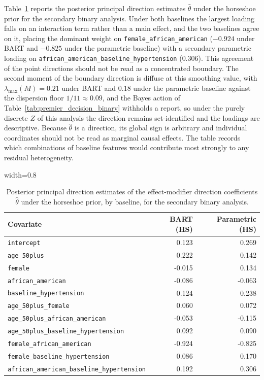 \documentclass[11pt]{article}
\theoremstyle{definition}
\theoremstyle{plain}
\begin{document}
Table~\ref{tab:theta_hat_hs_methods} reports the posterior principal direction estimates $\hat{\theta}$ under the horseshoe prior for the secondary binary analysis. Under both baselines the largest loading falls on an interaction term rather than a main effect, and the two baselines agree on it, placing the dominant weight on \texttt{female\_african\_american} ($-0.924$ under BART and $-0.825$ under the parametric baseline) with a secondary parametric loading on \texttt{african\_american\_baseline\_hypertension} ($0.306$). This agreement of the point directions should not be read as a concentrated boundary. The second moment of the boundary direction is diffuse at this smoothing value, with $\lambda_{\max}(M)=0.21$ under BART and $0.18$ under the parametric baseline against the dispersion floor $1/11\approx0.09$, and the Bayes action of Table~\ref{tab:premier_decision_binary} withholds a report, so under the purely discrete $Z$ of this analysis the direction remains set-identified and the loadings are descriptive. Because $\hat{\theta}$ is a direction, its global sign is arbitrary and individual coordinates should not be read as marginal causal effects. The table records which combinations of baseline features would contribute most strongly to any residual heterogeneity.

\begin{table}
  \centering
  \caption{Posterior principal direction estimates of the effect-modifier direction coefficients $\hat{\theta}$ under the horseshoe prior, by baseline, for the secondary binary analysis.}
  \begin{adjustbox}{width=0.8\textwidth}
  \begin{tabular}{l r r}
    \toprule
    \textbf{Covariate}  & \textbf{BART (HS)} & \textbf{Parametric (HS)} \\
    \midrule
    \texttt{intercept} & 0.123 & 0.269 \\
    \texttt{age\_50plus}  & 0.222 & 0.142 \\
    \texttt{female} & -0.015 & 0.134 \\
    \texttt{african\_american}  & -0.086 & -0.063 \\
    \texttt{baseline\_hypertension} & 0.124 & 0.238 \\
    \texttt{age\_50plus\_female}  & 0.060 & 0.072 \\
    \texttt{age\_50plus\_african\_american} & -0.053 & -0.115 \\
    \texttt{age\_50plus\_baseline\_hypertension} & 0.092 & 0.090 \\
    \texttt{female\_african\_american} & -0.924 & -0.825 \\
    \texttt{female\_baseline\_hypertension} & 0.086 & 0.170 \\
    \texttt{african\_american\_baseline\_hypertension} & 0.192 & 0.306 \\
    \bottomrule
  \end{tabular}
  \end{adjustbox}
  \label{tab:theta_hat_hs_methods}
\end{table}
\end{document}
